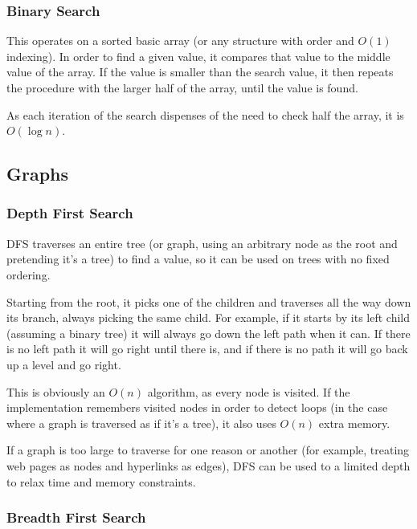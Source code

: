 \documentclass[]{article}
\begin{document}
\subsubsection{Binary Search}

This operates on a sorted basic array (or any structure with order and $O(1)$ indexing). In order to find a given value, it compares that value to the middle value of the array. If the value is smaller than the search value, it then repeats the procedure with the larger half of the array, until the value is found.

As each iteration of the search dispenses of the need to check half the array, it is $O(\log{n})$.

\pagebreak

\subsection{Graphs}

\subsubsection{Depth First Search}

DFS traverses an entire tree (or graph, using an arbitrary node as the root and pretending it's a tree) to find a value, so it can be used on trees with no fixed ordering.

Starting from the root, it picks one of the children and traverses all the way down its branch, always picking the same child. For example, if it starts by its left child (assuming a binary tree) it will always go down the left path when it can. If there is no left path it will go right until there is, and if there is no path it will go back up a level and go right.

This is obviously an $O(n)$ algorithm, as every node is visited. If the implementation remembers visited nodes in order to detect loops (in the case where a graph is traversed as if it's a tree), it also uses $O(n)$ extra memory.

If a graph is too large to traverse for one reason or another (for example, treating web pages as nodes and hyperlinks as edges), DFS can be used to a limited depth to relax time and memory constraints.

\subsubsection{Breadth First Search}
\end{document}
